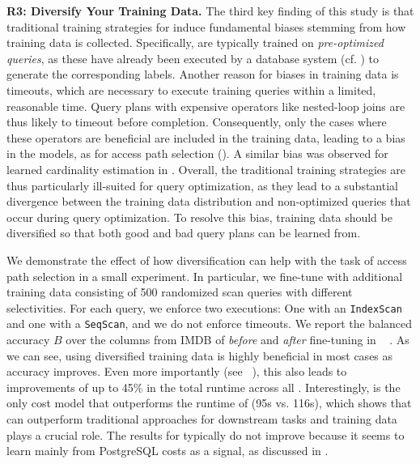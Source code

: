 \noindent \textbf{R3: Diversify Your Training Data.}
The third key finding of this study is that traditional training strategies for \lcms induce fundamental biases stemming from how training data is collected.
Specifically, \lcms are typically trained on \textit{pre-optimized queries}, as these have already been executed by a database system  (cf. ) to generate the corresponding labels.
Another reason for biases in training data is timeouts, which are necessary to execute training queries within a limited, reasonable time.
Query plans with expensive operators like nested-loop joins are thus likely to timeout before completion. 
Consequently, only the cases where these operators are beneficial are included in the training data, leading to a bias in the models, as for access path selection (). 
A similar bias was observed for learned cardinality estimation in \cite{reiner2023}.
Overall, the traditional training strategies are thus particularly ill-suited for query optimization, as they lead to a substantial divergence between the training data distribution and non-optimized queries that occur during query optimization.
To resolve this bias, training data should be diversified so that both good and bad query plans can be learned from.

We demonstrate the effect of how diversification can help with the task of access path selection in a small experiment.
In particular, we fine-tune \lcms with additional training data consisting of 500 randomized scan queries with different selectivities.
For each query, we enforce two executions: One with an \texttt{IndexScan} and one with a \texttt{SeqScan}, and we do not enforce timeouts.
We report the balanced accuracy $B$ over the columns from IMDB of  \textit{before} and \textit{after} fine-tuning in ~ .
As we can see, using diversified training data is highly beneficial in most cases as accuracy improves.
Even more importantly (see ~), this also leads to improvements of up to 45\% in the total runtime across all \lcms.
Interestingly, \zeroshot is the only cost model that outperforms the runtime of \postgresx (95s vs. 116s), which shows that \lcms can outperform traditional approaches for downstream tasks and training data plays a crucial role.
The results for \dace typically do not improve because it seems to learn mainly from PostgreSQL costs as a signal, as discussed in .

